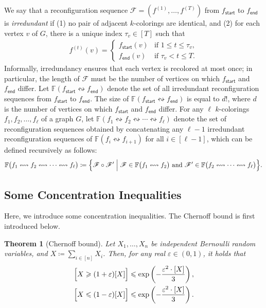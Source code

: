 \documentclass[11pt,fleqn]{article}
\renewcommand{\geq}{\geqslant}
\renewcommand{\leq}{\leqslant}
\renewcommand{\epsilon}{\varepsilon}
\newcommand{\reco}{\leftrightsquigarrow}
\newcommand{\defeq}{\coloneq}
\let\E\relax\DeclareMathOperator*{\E}{\mathbb{E}}  \let\Pr\relax\DeclareMathOperator*{\Pr}{\mathbb{Pr}}
\newcommand{\sss}{\mathsf{start}}
\newcommand{\ttt}{\mathsf{end}}
\newcommand{\f}{f}
\newcommand{\sqcol}{\scrF}
\newcommand{\stsqcol}{\bbF}
\newcommand{\bbF}{\mathbb{F}}
\newcommand{\scrF}{\mathscr{F}}
\let\Pr\relax\DeclareMathOperator*{\Pr}{\mathbb{P}}
\newtheorem{theorem}{Theorem}[section]
\theoremstyle{definition}
\numberwithin{equation}{section}
\begin{document}
We say that a reconfiguration sequence
$\sqcol = (\f^{(1)}, \ldots, \f^{(T)})$
from $\f_\sss$ to $\f_\ttt$ is \emph{irredundant} if 
(1) no pair of adjacent $k$-colorings are identical, and
(2) for each vertex $v$ of $G$, there is a unique index $\tau_v \in [T]$ such that
\begin{align}
    \f^{(t)}(v) =
    \begin{cases}
        \f_\sss(v) & \text{if } 1 \leq t \leq \tau_v, \\
        \f_\ttt(v) & \text{if } \tau_v < t \leq T.
    \end{cases}
\end{align}
Informally, irredundancy ensures that each vertex is recolored at most once;
in particular,
the length of $\sqcol$ must be the number of vertices on which $\f_\sss$ and $\f_\ttt$ differ.
Let $\stsqcol(\f_\sss \reco \f_\ttt)$ denote the set of 
    all irredundant reconfiguration sequences from $\f_\sss$ to $\f_\ttt$.
The size of $\stsqcol(\f_\sss \reco \f_\ttt)$ is equal to
$d!$, where $d$ is the number of vertices on which $\f_\sss$ and $\f_\ttt$ differ. 
For any $\ell$ $k$-colorings $\f_1, \f_2, \ldots, \f_\ell$ of a graph $G$,
let $\stsqcol(\f_1 \reco \f_2 \reco \cdots \reco \f_\ell)$ denote
the set of reconfiguration sequences obtained by concatenating
any $\ell-1$ irredundant reconfiguration sequences of
$\stsqcol(\f_i \reco \f_{i+1})$ for all $i \in [\ell-1]$,
which can be defined recursively as follows:
\begin{align}
    \stsqcol\bigl(\f_1 \reco \f_2 \reco \cdots \reco \f_\ell\bigr) \defeq
    \Bigl\{
        \sqcol \circ \sqcol' \Bigm|
        \sqcol \in \stsqcol\bigl(\f_1 \reco \f_2\bigr) \text{ and }
        \sqcol' \in \stsqcol\bigl(\f_2 \reco \cdots \reco \f_\ell\bigr)
    \Bigr\}.
\end{align}


\subsection{Some Concentration Inequalities}
Here, we introduce some concentration inequalities.
The Chernoff bound is first introduced below.


\begin{theorem}[Chernoff bound]
\label{thm:Chernoff}
    Let $X_1, \ldots, X_n$ be independent Bernoulli random variables, and
    $X \defeq \sum_{i \in [n]} X_i$.
    Then, for any real $\epsilon \in (0,1)$, it holds that
    \begin{align}
    \begin{aligned}
        \Pr\Bigl[ X \geq (1+\epsilon)\E[X] \Bigr]
        & \leq \exp\left(-\frac{\epsilon^2 \cdot \E[X]}{3}\right), \\
        \Pr\Bigl[ X \leq (1-\epsilon)\E[X] \Bigr]
        & \leq \exp\left(-\frac{\epsilon^2 \cdot \E[X]}{3}\right).
    \end{aligned}
    \end{align}
\end{theorem}
\end{document}
